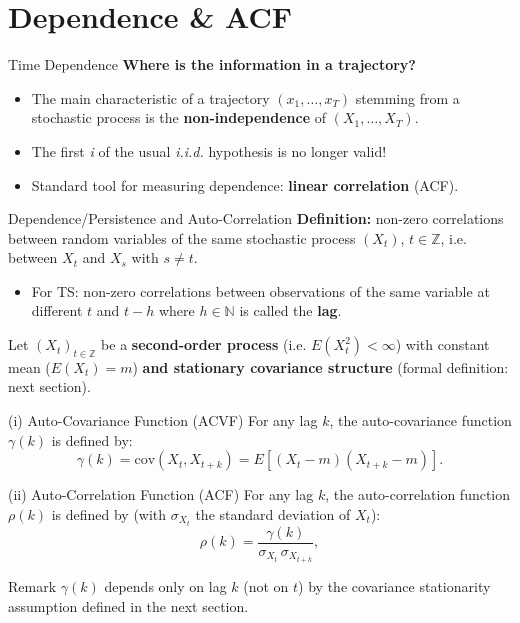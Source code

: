 \documentclass{beamer}
\begin{document}
\section{Dependence \& ACF}

\begin{frame}{Time Dependence}
\textbf{Where is the information in a trajectory?}
\begin{itemize}
  \item The main characteristic of a trajectory $(x_1,\ldots,x_T)$ stemming from a stochastic process is the \textbf{non-independence} of $(X_1,\ldots,X_T)$.
  \item The first \emph{i} of the usual \textit{i.i.d.} hypothesis is no longer valid!
  \item Standard tool for measuring dependence: \textbf{linear correlation} (ACF).
\end{itemize}
\end{frame}






\begin{frame}{Dependence/Persistence and Auto-Correlation}
\small
\textbf{Definition:} non-zero correlations between random variables of the same stochastic process $(X_t)$, $t \in \mathbb{Z}$,  
i.e. between $X_t$ and $X_s$ with $s \neq t$.  

\begin{itemize}
    \item For TS: non-zero correlations between observations of the same variable at different $t$ and $t-h$ where $h \in \mathbb{N}$ is called the \textbf{lag}.
\end{itemize}
\pause
\vspace{0.3cm}
Let $(X_t)_{t \in \mathbb{Z}}$ be a \textbf{second-order process} (i.e. $E(X_t^2) < \infty$) with constant mean ($E(X_t) = m$) \textbf{and stationary covariance structure} (formal definition: next section).
\begin{block}{(i) Auto-Covariance Function (ACVF)}
For any lag $k$, the auto-covariance function $\gamma(k)$ is defined by:
\[
\gamma(k) = \mathrm{cov}(X_t, X_{t+k}) = E[(X_t - m)(X_{t+k} - m)].
\]
\end{block}
\begin{block}{(ii) Auto-Correlation Function (ACF)}
For any lag $k$, the auto-correlation function $\rho(k)$ is defined by (with $\sigma_{X_t}$ the standard deviation of $X_t$):
\[\rho(k) = \frac{\gamma(k)}{\sigma_{X_t}\,\sigma_{X_{t+k}}},
\]
\end{block}
\begin{alertblock}{\footnotesize Remark}
\scriptsize $\gamma(k)$ depends only on lag $k$ (not on $t$) by the covariance stationarity assumption defined in the next section.
\end{alertblock}
\end{frame}
\end{document}
